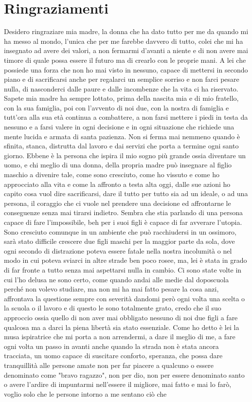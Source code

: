 \chapter{Ringraziamenti}

Desidero ringraziare mia madre, la donna che ha dato tutto per me da quando mi ha messo al mondo, l'unica che per me farebbe davvero di tutto, colei che mi ha insegnato ad avere dei valori, a non fermarmi d'avanti a niente e di non avere mai timore di quale possa essere il futuro ma di crearlo con le proprie mani. A lei che possiede una forza che non ho mai visto in nessuno, capace di mettersi in secondo piano e di sacrificarsi anche per regalarci un semplice sorriso e non farci pesare nulla, di nasconderci dalle paure e dalle incombenze che la vita ci ha riservato. Sapete mia madre ha sempre lottato, prima della nascita mia e di mio fratello, con la sua famiglia, poi con l'avvento di noi due, con la nostra di famiglia e tutt'ora alla sua età continua a combattere, a non farsi mettere i piedi in testa da nessuno e a farsi valere in ogni decisione e in ogni situazione che richiede una mente lucida e armata di santa pazienza. Non si ferma mai nemmeno quando è sfinita, stanca, distrutta dal lavoro e dai servizi che porta a termine ogni santo giorno. Ebbene è la persona che ispira il mio sogno più grande ossia diventare un uomo, e chi meglio di una donna, della propria madre può insegnare al figlio maschio a divenire tale, come sono cresciuto, come ho vissuto e come ho approcciato alla vita e come la affronto a testa alta oggi, dalle sue azioni ho capito cosa vuol dire sacrificarsi, dare il tutto per tutto sia ad un ideale, o ad una persona, il coraggio che ci vuole nel prendere una decisione ed affrontarne le conseguenze senza mai tirarsi indietro. Sembra che stia parlando di una persona capace di fare l'impossibile, beh per i suoi figli è capace di far avverare l'utopia. Sono cresciuto comunque in un ambiente che può racchiudersi in un ossimoro, sarà stato difficile crescere due figli maschi per la maggior parte da sola, dove ogni secondo di distrazione poteva essere fatale nella nostra incolumità o nel modo in cui poteva sviarci in altre strade ben poco rosee, ma, lei è stata in grado di far fronte a tutto senza mai aspettarsi nulla in cambio. Ci sono state volte in cui l'ho delusa ne sono certo, come quando andai alle medie dal doposcuola perché non volevo studiare, ma non mi ha mai fatto pesare la cosa anzi, affrontava la questione sempre con severità dandomi però ogni volta una scelta o la scuola o il lavoro e di questo le sono totalmente grato, credo che il suo approccio ossia quello di non aver mai obbligato nessuno di noi due figli a fare qualcosa ma a darci la piena libertà sia stato essenziale. Come ho detto è lei la musa ispiratrice che mi porta a non arrendermi, a dare il meglio di me, a fare ogni volta un passo in avanti anche quando la strada non è stata ancora tracciata, un uomo capace di suscitare conforto, speranza, che possa dare tranquillità alle persone amate non per far piacere a qualcuno o essere denominato come "bravo ragazzo", non per dio, non per essere denominato santo o avere l'ardire di impuntarmi nell'essere il migliore, mai fatto e mai lo farò, voglio solo che le persone intorno a me sentano ciò che 